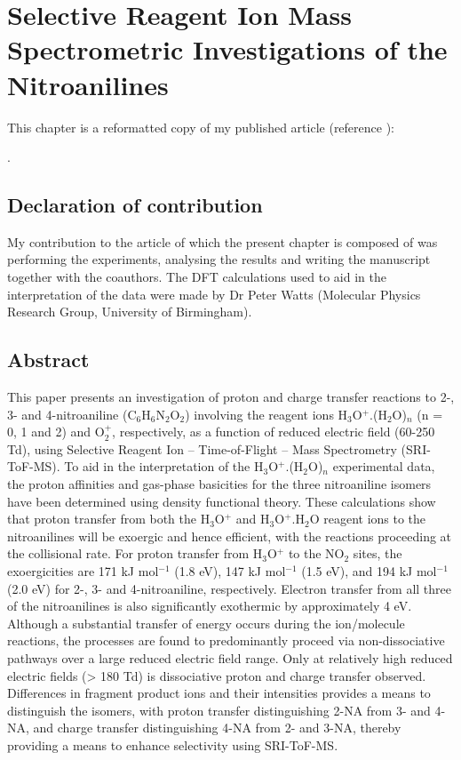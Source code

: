 

\chapter{Selective Reagent Ion Mass Spectrometric Investigations of the Nitroanilines}\label{chapter:nas}


This chapter is a reformatted copy of my published article (reference \cite{nitroanilinespaperreference}):

.








\section*{Declaration of contribution}
My contribution to the article of which the present chapter is composed of was 
performing the experiments, analysing the results and writing the manuscript together with the coauthors. 
The DFT calculations used to aid in the interpretation of the data were made by Dr Peter Watts (Molecular Physics Research Group, University of Birmingham).








\section{Abstract}
This paper presents an investigation of proton and charge transfer reactions to 2-, 3- and 4-nitroaniline (C$_6$H$_6$N$_2$O$_2$) involving the reagent ions H$_3$O$^+$.(H$_2$O)$_n$ (n = 0, 1 and 2) and O$_2^+$, respectively, as a function of reduced electric field (60-250 Td), using Selective Reagent Ion – Time-of-Flight – Mass Spectrometry (SRI-ToF-MS). To aid in the interpretation of the H$_3$O$^+$.(H$_2$O)$_n$ experimental data, the proton affinities and gas-phase basicities for the three nitroaniline isomers have been determined using density functional theory. These calculations show that proton transfer from both the H$_3$O$^+$ and H$_3$O$^+$.H$_2$O reagent ions to the nitroanilines will be exoergic and hence efficient, with the reactions proceeding at the collisional rate. For proton transfer from H$_3$O$^+$ to the NO$_2$ sites, the exoergicities are 171 kJ mol$^{-1}$ (1.8 eV), 147 kJ mol$^{-1}$ (1.5 eV), and 194 kJ mol$^{-1}$ (2.0 eV) for 2-, 3- and 4-nitroaniline, respectively. Electron transfer from all three of the nitroanilines is also significantly exothermic by approximately 4 eV. Although a substantial transfer of energy occurs during the ion/molecule reactions, the processes are found to predominantly proceed via non-dissociative pathways over a large reduced electric field range. Only at relatively high reduced electric fields (> 180 Td) is dissociative proton and charge transfer observed. Differences in fragment product ions and their intensities provides a means to distinguish the isomers, with proton transfer distinguishing 2-NA from 3- and 4-NA, and charge transfer distinguishing 4-NA from 2- and 3-NA, thereby providing a means to enhance selectivity using SRI-ToF-MS.

